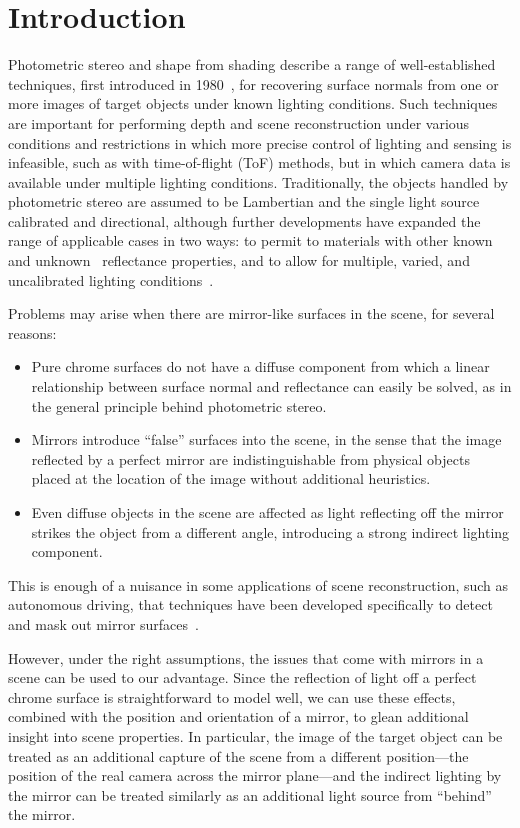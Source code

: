 \section{Introduction}\label{sec:introduction}
Photometric stereo and shape from shading describe a range of well-established
techniques, first introduced in 1980~\cite{woodham}, for recovering surface
normals from one or more images of target objects under known lighting
conditions. Such techniques are important for performing depth and scene
reconstruction under various conditions and restrictions in which more precise
control of lighting and sensing is infeasible, such as with time-of-flight
(ToF) methods, but in which camera data is available under multiple lighting
conditions. Traditionally, the objects handled by photometric stereo are
assumed to be Lambertian and the single light source calibrated and
directional, although further developments have expanded the range of
applicable cases in two ways: to permit to materials with other
known~\cite{defigueiredo} and unknown~\cite{hertzmann} reflectance properties,
and to allow for multiple, varied, and uncalibrated lighting
conditions~\cite{basri}.

Problems may arise when there are mirror-like surfaces in the scene, for
several reasons:
\begin{itemize}
  \item Pure chrome surfaces do not have a diffuse component from which a
  linear relationship between surface normal and reflectance can easily be
  solved, as in the general principle behind photometric stereo.
  \item Mirrors introduce ``false'' surfaces into the scene, in the sense that
  the image reflected by a perfect mirror are indistinguishable from physical
  objects placed at the location of the image without additional heuristics.
  \item Even diffuse objects in the scene are affected as light reflecting off
  the mirror strikes the object from a different angle, introducing a strong
  indirect lighting component.
\end{itemize}
This is enough of a nuisance in some applications of scene reconstruction, such
as autonomous driving, that techniques have been developed specifically to
detect and mask out mirror surfaces~\cite{yang}.

However, under the right assumptions, the issues that come with mirrors in a
scene can be used to our advantage. Since the reflection of light off a perfect
chrome surface is straightforward to model well, we can use these effects,
combined with the position and orientation of a mirror, to glean additional
insight into scene properties. In particular, the image of the target object
can be treated as an additional capture of the scene from a different
position---the position of the real camera across the mirror plane---and the
indirect lighting by the mirror can be treated similarly as an additional light
source from ``behind'' the mirror.

